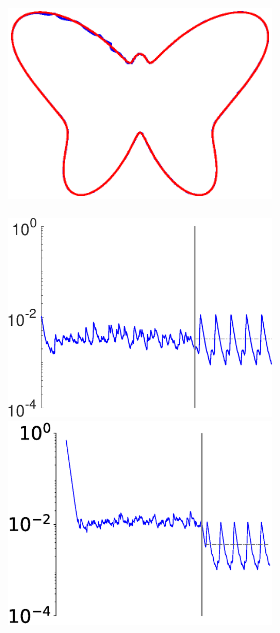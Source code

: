 \begin{figure}
\begin{subfigure}{\textwidth}
\begin{subfigure}{\textwidth}
        \hspace{3em}
        \includegraphics[trim=1.5cm 2cm 1.5cm 2cm, clip=true,height=.1\textheight]{Figures/Fig_T1/Python/FORCE_T1_Trajectory_noaxis}

        \end{subfigure}
         
         
        \textbf{}\begin{subfigure}{\textwidth}
        \centering
        
        \includegraphics[height=0.12\linewidth,width=.45\linewidth]{Figures/Fig_T1/MATLAB/FORCE_T1_MSE.eps}
        \includegraphics[height=0.12\linewidth,width=.45\linewidth]{Figures/Fig_T1/Python/FORCE_T1_MSE.eps}
        
        \end{subfigure}
        
        
        \textbf{}\begin{subfigure}{\textwidth}
        \centering
        

\end{subfigure}
\end{subfigure}
\end{figure}
